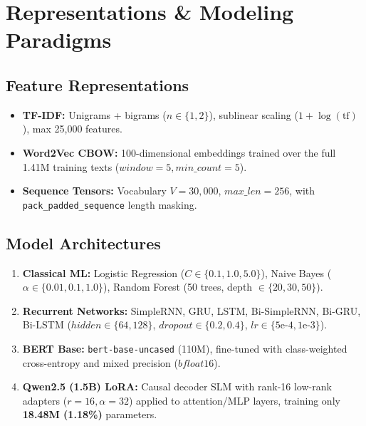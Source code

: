 \documentclass[11pt,a4paper,twocolumn]{article}
\begin{document}
\section{Representations \& Modeling Paradigms}

\subsection{Feature Representations}
\begin{itemize}
    \item \textbf{TF-IDF:} Unigrams + bigrams ($n \in \{1, 2\}$), sublinear scaling ($1 + \log(\text{tf})$), max 25,000 features.
    \item \textbf{Word2Vec CBOW:} 100-dimensional embeddings trained over the full 1.41M training texts ($window=5, min\_count=5$).
    \item \textbf{Sequence Tensors:} Vocabulary $V=30,000$, $max\_len=256$, with \texttt{pack\_padded\_sequence} length masking.
\end{itemize}

\subsection{Model Architectures}
\begin{enumerate}
    \item \textbf{Classical ML:} Logistic Regression ($C \in \{0.1, 1.0, 5.0\}$), Naive Bayes ($\alpha \in \{0.01, 0.1, 1.0\}$), Random Forest (50 trees, depth $\in \{20, 30, 50\}$).
    \item \textbf{Recurrent Networks:} SimpleRNN, GRU, LSTM, Bi-SimpleRNN, Bi-GRU, Bi-LSTM ($hidden \in \{64, 128\}$, $dropout \in \{0.2, 0.4\}$, $lr \in \{5\text{e-}4, 1\text{e-}3\}$).
    \item \textbf{BERT Base:} \texttt{bert-base-uncased} (110M), fine-tuned with class-weighted cross-entropy and mixed precision ($bfloat16$).
    \item \textbf{Qwen2.5 (1.5B) LoRA:} Causal decoder SLM with rank-16 low-rank adapters ($r=16, \alpha=32$) applied to attention/MLP layers, training only \textbf{18.48M (1.18\%)} parameters.
\end{enumerate}
\end{document}

